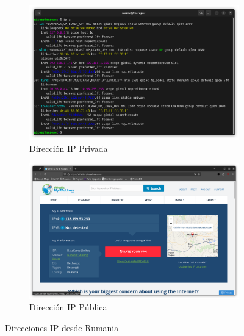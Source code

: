\begin{figure}[H]
    \centering
    \begin{subfigure}{.5\textwidth}
        \centering
        \includegraphics[width=\linewidth]{IP-Privada-Rumania.png}
        \caption{Dirección IP Privada}
    \end{subfigure}%
    \begin{subfigure}{.5\textwidth}
        \centering
        \includegraphics[width=\linewidth]{IP-Publica-Rumania.png}
        \caption{Dirección IP Pública}
    \end{subfigure}
    \caption{Direcciones IP desde Rumania}
    \label{fig:IPs-Rumania}
\end{figure}

